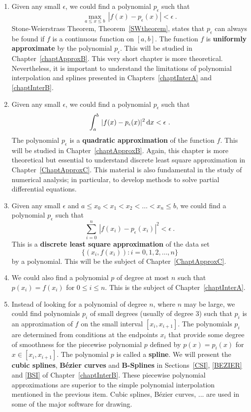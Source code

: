 \begin{enumerate}
\item Given any small $\epsilon$, we could find a polynomial
$p_\epsilon$ such that
\[
\max_{a\leq x \leq b} \,|f(x) - p_\epsilon(x)| < \epsilon \ .
\]
Stone-Weierstrass Theorem, Theorem~\ref{SWtheorem}, states that
$p_\epsilon$ can always be found if $f$ is a continuous function on
$[a,b]$.  The function $f$ is
{\bfseries uniformly approximate}
by the polynomial $p_\epsilon$.  This will
be studied in Chapter~\ref{chaptApproxB}.  This very short
chapter is more theoretical.  Nevertheless, it is important to
understand the limitations of polynomial interpolation and splines
presented in Chapters~\ref{chaptInterA} and
\ref{chaptInterB}.
\item Given any small $\epsilon$, we could find a polynomial
$p_\epsilon$ such that
\[
\int_a^b \,|f(x) - p_\epsilon(x)|^2 \,\mathrm{d}x < \epsilon \ .
\]
The polynomial $p_\epsilon$ is a
{\bfseries quadratic approximation}
of the function $f$.  This will be studied in Chapter~\ref{chaptApproxB}.
Again, this chapter is more theoretical but essential to understand
discrete least square approximation in Chapter~\ref{ChaptApproxC}.
This material is also fundamental in the study of numerical analysis;
in particular, to develop methods to solve partial differential
equations.
\item Given any small $\epsilon$ and
$a \leq x_0 < x_1 < x_2 < \ldots < x_n \leq b$, we could find a polynomial
$p_\epsilon$ such that
\[
\sum_{i=0}^n \,|f(x_i) - p_\epsilon(x_i)|^2 < \epsilon \ .
\]
This is a {\bfseries discrete least square
approximation}
of the data set
\[
\{(x_i,f(x_i)) : i=0,1,2,\ldots, n\}
\]
by a polynomial.  This will be the subject of Chapter~\ref{ChaptApproxC}.
\item We could also find a polynomial $p$ of degree at most
$n$ such that $p(x_i) = f(x_i)$ for $0 \leq i \leq n$.  This is the
subject of Chapter~\ref{chaptInterA}.
\item Instead of looking for a polynomial of degree $n$, where $n$ may
be large, we could find polynomials $p_i$ of small degrees (usually of
degree $3$) such that $p_i$ is an approximation of $f$ on the small
interval $[x_i,x_{i+1}]$.  The polynomials $p_i$ are determined from
conditions at the endpoints $x_i$ that provide some degree of
smoothness for the piecewise polynomial $p$ defined by $p(x) = p_i(x)$
for $x\in [x_i, x_{i+1}]$.  The polynomial $p$ is called a
{\bfseries spline}.   We will present the
{\bfseries cubic splines}, {\bfseries B\'ezier curves} and
{\bfseries B-Splines}
in Sections~\ref{CSI}, \ref{BEZIER} and \ref{BSI} of
Chapter~\ref{chaptInterB}.  These piecewise polynomial approximations
are superior to the simple polynomial interpolation mentioned in the
previous item.  Cubic splines, B\'ezier curves, ... are used in some
of the major software for drawing.
\end{enumerate}

